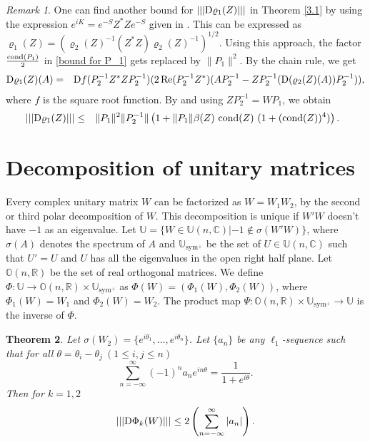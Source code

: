 \documentclass[12pt,epsfig,reqno]{amsart}
\newcommand{\C}{\mathbb{C}}
\newcommand{\R}{\mathbb{R}}
\newcommand{\De}{{\rm D}}
\newtheorem{thm}{Theorem}
\theoremstyle{remark}
\newtheorem{remark}[thm]{Remark}
\newcommand{\h}{\mathop{{\rm Re}}}
\begin{document}
\begin{remark}
One can find another bound for  $|||\De \varrho_1(Z)|||$ in Theorem \ref{3.1} by using the expression $e^{iK}=e^{-S} Z^*Z e^{-S}$ given in \cite{bhatia_bipolar}. This can be expressed as $\varrho_1(Z)=\left(\varrho_2(Z)^{-1} (Z^*Z) \varrho_2(Z)^{-1}\right)^{1/2}.$ Using this approach, the factor $\frac{\text{\rm cond}(P_1)}{2}$ in \eqref{bound for P_1}  gets replaced by $\|P_1\|^2$. By the chain rule, we get
\begin{eqnarray*}
\De \varrho_1(Z)(A)&=& \De f(P_2^{-1} Z^*Z P_2^{-1})(2\h ( P_2^{-1} Z^*)(A P_2^{-1} -Z P_2^{-1} (\De (\varrho_2(Z)(A)) P_2^{-1})),
\end{eqnarray*}
where $f$ is the square root function.
By \cite[Theorem X.3.1]{bhatia_matrix_analysis} and using $ZP_2^{-1}=W P_1$, %
we obtain
\begin{eqnarray}
|||\De \varrho_1(Z)|||&\leq & \|P_1\|^2 \|P_2^{-1}\| \left(1+\|P_1\| \beta(Z)\ \text{\rm cond} (Z)\ (1+(\text{\rm cond} (Z))^4) \right).\hspace{0.2cm}\label{4.16}
\end{eqnarray}
\end{remark}

\section{Decomposition of unitary matrices}\label{section 4}
Every complex unitary matrix $W$ can be factorized as $W=W_1 W_2$, by the second or third polar decomposition of $W$.
This decomposition is unique if $W' W$ doesn't have $-1$ as an eigenvalue. Let $\mathbb U=\{W\in \mathbb U(n,\C) |  -1 \notin \sigma(W' W)\}$, where $\sigma(A)$ denotes the spectrum of $A$ and  $\mathbb U_{\text{sym}^+}$ be the set of $U\in \mathbb U(n,\C)$ such that $U'=U$ and $U$ has all the eigenvalues in the open right half plane. Let $\mathbb O(n,\R)$ be the set of real orthogonal matrices.
We define $\Phi: \mathbb U\rightarrow \mathbb O(n,\R) \times \mathbb U_{\text{sym}^+}$ as $\Phi(W)=(\Phi_1(W),\Phi_2(W))$, where $\Phi_1(W)=W_1$ and $\Phi_2(W)=W_2$. The product map $\Psi: \mathbb O(n,\R) \times \mathbb U_{\text{sym}^+}\rightarrow \mathbb U$ is the inverse of $\Phi$. %

\begin{thm}\label{thm:perturbation_bound_for unitary}
Let $\sigma(W_2)=\{e^{i\theta_1},\ldots,e^{i\theta_n}\}$. Let $\{a_n\}$ be any $\ell_1$-sequence such that for all $\theta= \theta_i-\theta_j \ (1\leq i,j\leq n)$ \begin{equation}\sum_{n=-\infty}^\infty (-1)^n a_n e^{in\theta}= \frac{1}{1+e^{i\theta}}.\label{an}\end{equation}
Then for $k=1,2$
\begin{equation}
|||{\De \Phi_k (W)}|||\leq 2 \left(\sum_{n=-\infty}^{\infty} |a_n|\right).
\end{equation}
\end{thm}
\end{document}

